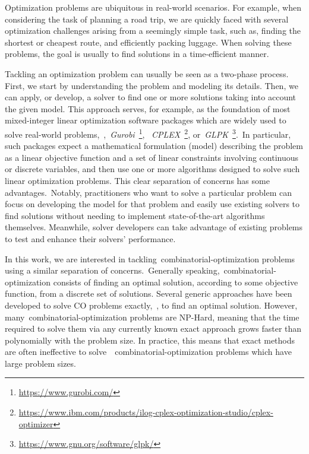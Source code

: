 Optimization problems are ubiquitous in real-world scenarios. For example, when
considering the task of planning a road trip, we are quickly faced with several
optimization challenges arising from a seemingly simple task, such as, finding
the shortest or cheapest route, and efficiently packing luggage. When solving
these problems, the goal is usually to find  solutions in a
time-efficient manner.

Tackling an optimization problem can usually be seen as a two-phase process.
First, we start by understanding the problem and modeling its details. Then, we
can apply, or develop, a solver to find one or more solutions taking into
account the given model. This approach serves, for example, as the foundation of
most mixed-integer linear optimization software packages which are widely used to solve
real-world problems,~\eg{},~\textit{Gurobi}~\footnote{\url{https://www.gurobi.com/}},
~\textit{CPLEX}~\footnote{\url{https://www.ibm.com/products/ilog-cplex-optimization-studio/cplex-optimizer}},
or~\textit{GLPK}~\footnote{\url{https://www.gnu.org/software/glpk/}}.~In particular,
such packages expect a mathematical formulation (model) describing the problem
as a linear objective function and a set of linear constraints involving
continuous or discrete variables, and then use one or more algorithms designed
to solve such linear optimization problems. This clear separation of concerns
has some advantages.~Notably, practitioners who want to solve a particular
problem can focus on developing the model for that problem and easily use
existing solvers to find solutions without needing to implement state-of-the-art
algorithms themselves. Meanwhile, solver developers can take advantage of
existing problems to test and enhance their solvers' performance.

In this work, we are interested in tackling~\acrfull{combinatorial-optimization}
problems using a similar separation of concerns.~Generally
speaking,~\acrshort{combinatorial-optimization} consists of finding an optimal
solution, according to some objective function, from a discrete set of
solutions. Several generic approaches have been developed to solve CO problems
exactly,~\ie{}, to find an optimal solution. However,
many~\acrshort{combinatorial-optimization} problems are NP-Hard, meaning that
the time required to solve them via any currently known exact approach grows
faster than polynomially with the problem size. In practice, this means that
exact methods are often ineffective to solve~~\acrshort{combinatorial-optimization} problems
which have large problem sizes.

